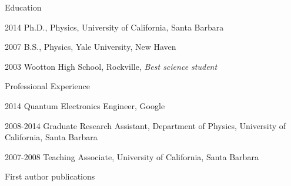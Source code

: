 \begin{vitae}
\begin{vitaesection}{Education}
\item [2014] Ph.D., Physics, University of California, Santa Barbara
\item [2007] B.S., Physics, Yale University, New Haven
\item [2003] Wootton High School, Rockville, \emph{Best science student}
\end{vitaesection}

\begin{vitaesection}{Professional Experience}
\item [2014] Quantum Electronics Engineer, Google
\item [2008-2014] Graduate Research Assistant, Department of Physics, University of California, Santa Barbara
\item [2007-2008] Teaching Associate, University of California, Santa Barbara
\end{vitaesection}

\begin{vitaesectnodate}{First author publications}

\end{vitaesectnodate}
\end{vitae}